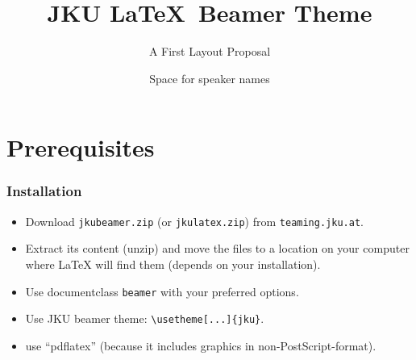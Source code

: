 \documentclass[aspectratio=169]{beamer}
\title{JKU \LaTeX\ Beamer Theme}
\subtitle{A First Layout Proposal}
\author{Space for speaker names}
\institute{Space for institute information}
\begin{document}
\jkulogoblack

\jkulogogrey

\jkulogowhite


%
%

\maketitle

%
%

\section{Prerequisites}


\begin{frame}[fragile]
\frametitle{Installation}

\begin{itemize}
	\item Download \texttt{jkubeamer.zip} (or \texttt{jkulatex.zip}) from \texttt{teaming.jku.at}.
	\item Extract its content (unzip) and move the files to a location on your computer where {\LaTeX} will find them (depends on your installation).
	\item Use documentclass \texttt{beamer} with your preferred options.
	\item Use JKU beamer theme: \verb+\usetheme[...]{jku}+.
	\item use ``pdflatex'' (because it includes graphics in non-PostScript-format).
\end{itemize}
\end{frame}

\end{document}
